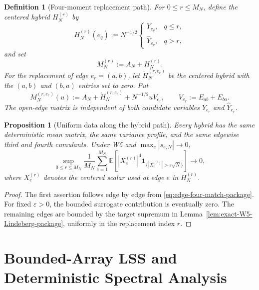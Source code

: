 \documentclass[10pt,a4paper]{amsart}
\newtheorem{proposition}[theorem]{Proposition}
\newtheorem{definition}[theorem]{Definition}
\newcommand{\E}{\mathbb E}
\newcommand{\one}{\mathbf 1}
\begin{document}
\begin{definition}[Four-moment replacement path]
\label{def:hybrid-package}
For $0\le r\le M_N$, define the centered hybrid $H_N^{(r)}$ by
\begin{equation}\label{eq:hybrid-entry-package}
 H_N^{(r)}(e_q)
 :=N^{-1/2}
 \begin{cases}
 Y_{e_q},&q\le r,\\
 \widehat Y_{e_q},&q>r,
 \end{cases}
\end{equation}
and set
\begin{equation}\label{eq:full-hybrid-package}
 M_N^{(r)}:=A_N+H_N^{(r)}.
\end{equation}
For the replacement of edge $e_r=(a,b)$, let
$\mathring H_N^{(r,e_r)}$ be the centered hybrid with the $(a,b)$ and
$(b,a)$ entries set to zero.  Put
\begin{equation}\label{eq:open-edge-package}
 M_N^{(r,e_r)}(u)
 :=A_N+\mathring H_N^{(r,e_r)}+N^{-1/2}uV_{e_r},
 \qquad
 V_{e_r}:=E_{ab}+E_{ba}.
\end{equation}
The open-edge matrix is independent of both candidate variables
$Y_{e_r}$ and $\widehat Y_{e_r}$.
\end{definition}

\begin{proposition}[Uniform data along the hybrid path]
\label{prop:hybrid-data-package}
Every hybrid has the same deterministic mean matrix, the same variance
profile, and the same edgewise third and fourth cumulants.  Under W5 and
$\max_e|s_{e,N}|\to0$,
\begin{equation}\label{eq:uniform-hybrid-Lindeberg-package}
 \sup_{0\le r\le M_N}
 \frac1{M_N}\sum_{e=1}^{M_N}
 \E\left[
 |X_e^{(r)}|^4
 \one_{\{|X_e^{(r)}|>\varepsilon\sqrt N\}}
 \right]\longrightarrow0,
\end{equation}
where $X_e^{(r)}$ denotes the centered scalar used at edge $e$ in
$H_N^{(r)}$.
\end{proposition}

\begin{proof}
The first assertion follows edge by edge from
\eqref{eq:edge-four-match-package}.  For fixed $\varepsilon>0$, the bounded
surrogate contribution is eventually zero.  The remaining edges are bounded
by the target supremum in Lemma~\ref{lem:exact-W5-Lindeberg-package}, uniformly
in the replacement index $r$.
\end{proof}

\section{Bounded-Array LSS and Deterministic Spectral Analysis}
\label{sec:R3-package}
\end{document}
